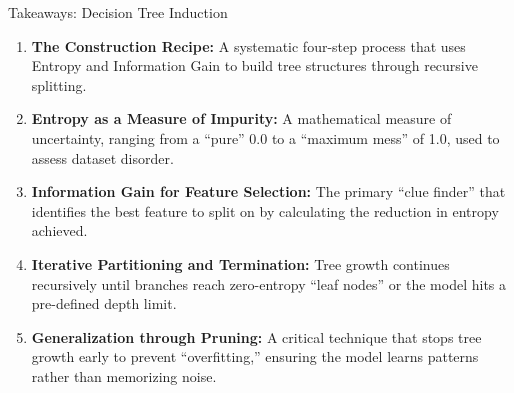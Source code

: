 \documentclass[aspectratio=169]{beamer}
\begin{document}
\begin{frame}{Takeaways: Decision Tree Induction}
    \small
    \begin{enumerate}
        \item \textbf{The Construction Recipe:} A systematic four-step process that uses Entropy and Information Gain to build tree structures through recursive splitting. \pause
        \item \textbf{Entropy as a Measure of Impurity:} A mathematical measure of uncertainty, ranging from a ``pure'' 0.0 to a ``maximum mess'' of 1.0, used to assess dataset disorder. \pause
        \item \textbf{Information Gain for Feature Selection:} The primary ``clue finder'' that identifies the best feature to split on by calculating the reduction in entropy achieved. \pause
        \item \textbf{Iterative Partitioning and Termination:} Tree growth continues recursively until branches reach zero-entropy ``leaf nodes'' or the model hits a pre-defined depth limit. \pause
        \item \textbf{Generalization through Pruning:} A critical technique that stops tree growth early to prevent ``overfitting,'' ensuring the model learns patterns rather than memorizing noise.
    \end{enumerate}
\end{frame}

\end{document}
